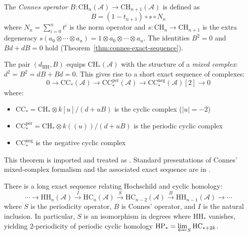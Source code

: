 \begin{definition}
\label{def:connes-B}
The \emph{Connes operator} $B: \mathrm{CH}_n(\mathcal{A}) \to \mathrm{CH}_{n+1}(\mathcal{A})$ is defined as
\[B = (1-t_{n+1}) \circ s \circ N_n\]
where $N_n = \sum_{i=0}^{n} t^i$ is the norm operator and $s: \mathrm{CH}_n \to \mathrm{CH}_{n+1}$ is the extra degeneracy $s(a_0 \otimes \cdots \otimes a_n) = 1 \otimes a_0 \otimes \cdots \otimes a_n$. The identities $B^2 = 0$ and $Bd + dB = 0$ hold (Theorem~\ref{thm:connes-exact-sequence}).
\end{definition}

\begin{theorem}
\label{thm:connes-exact-sequence}
The pair $(d_{\mathrm{HH}}, B)$ equips $\mathrm{CH}_*(\mathcal{A})$ with the
structure of a \emph{mixed complex}: $d^2 = B^2 = dB + Bd = 0$.
This gives rise to a short exact sequence of complexes:
\[0 \to \mathrm{CC}_*(\mathcal{A}) \to \mathrm{CC}_*^{\mathrm{per}}(\mathcal{A})
\to \mathrm{CC}_*^{\mathrm{neg}}(\mathcal{A})[2] \to 0\]
where:
\begin{itemize}
\item $\mathrm{CC}_* = \mathrm{CH}_* \otimes k[u]/(d + uB)$ is the cyclic complex
  ($|u| = -2$)
\item $\mathrm{CC}_*^{\mathrm{per}} = \mathrm{CH}_* \otimes k((u))/(d+uB)$ is the
  periodic cyclic complex
\item $\mathrm{CC}_*^{\mathrm{neg}}$ is the negative cyclic complex
\end{itemize}
\end{theorem}

\begin{remark}
This theorem is imported and treated as \ClaimStatusProvedElsewhere. Standard
presentations of Connes' mixed-complex formalism and the associated exact
sequence are in \cite{Connes85,Loday98}.
\end{remark}

\begin{corollary}
\label{cor:connes-SBI}
There is a long exact sequence relating Hochschild and cyclic homology:
\[\cdots \to \mathrm{HH}_n(\mathcal{A}) \xrightarrow{I} \mathrm{HC}_n(\mathcal{A}) \xrightarrow{S} \mathrm{HC}_{n-2}(\mathcal{A}) \xrightarrow{B} \mathrm{HH}_{n-1}(\mathcal{A}) \to \cdots\]
where $S$ is the periodicity operator, $B$ is Connes' operator, and $I$ is the natural inclusion. In particular, $S$ is an isomorphism in degrees where $\mathrm{HH}_*$ vanishes, yielding $2$-periodicity of periodic cyclic homology $\mathrm{HP}_* = \varprojlim_S \mathrm{HC}_{*+2k}$.
\end{corollary}


